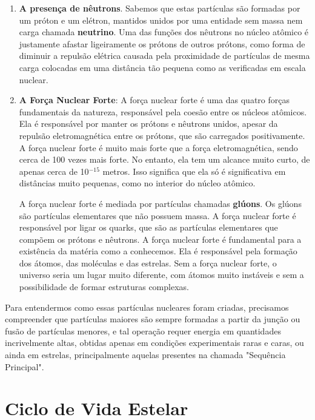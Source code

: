 \documentclass[a4paper,12pt,]{book}
\begin{document}
\begin{enumerate}
	\item \textbf{A presença de nêutrons}. Sabemos que estas partículas são formadas por um próton e um elétron, mantidos unidos por uma entidade sem massa nem carga chamada \textbf{neutrino}. Uma das funções dos nêutrons no núcleo atômico é justamente afastar ligeiramente os prótons de outros prótons, como forma de diminuir a repulsão elétrica causada pela proximidade de partículas de mesma carga colocadas em uma distância tão pequena como as verificadas em escala nuclear.
	\item \textbf{A Força Nuclear Forte}: A força nuclear forte é uma das quatro forças fundamentais da natureza, responsável pela coesão entre os núcleos atômicos. Ela é responsável por manter os prótons e nêutrons unidos, apesar da repulsão eletromagnética entre os prótons, que são carregados positivamente. A força nuclear forte é muito mais forte que a força eletromagnética, sendo cerca de 100 vezes mais forte. No entanto, ela tem um alcance muito curto, de apenas cerca de 10$^{-15}$ metros. Isso significa que ela só é significativa em distâncias muito pequenas, como no interior do núcleo atômico.
	
	A força nuclear forte é mediada por partículas chamadas \textbf{glúons}. Os glúons são partículas elementares que não possuem massa. A força nuclear forte é responsável por ligar os quarks, que são as partículas elementares que compõem os prótons e nêutrons. A força nuclear forte é fundamental para a existência da matéria como a conhecemos. Ela é responsável pela formação dos átomos, das moléculas e das estrelas. Sem a força nuclear forte, o universo seria um lugar muito diferente, com átomos muito instáveis e sem a possibilidade de formar estruturas complexas.
\end{enumerate}

Para entendermos como essas partículas nucleares foram criadas, precisamos compreender que partículas maiores são sempre formadas a partir da junção ou fusão de partículas menores, e tal operação requer energia em quantidades incrivelmente altas, obtidas apenas em condições experimentais raras e caras, ou ainda em estrelas, principalmente aquelas presentes na chamada "Sequência Principal".

\section{Ciclo de Vida Estelar}
\end{document}
